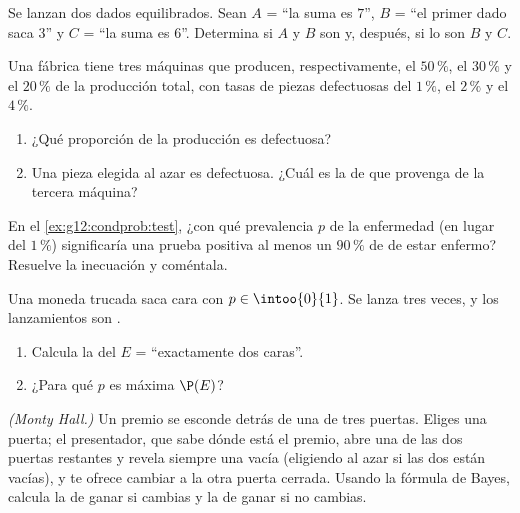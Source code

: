 \begin{exercise}[$\star$]\label{exo:g12:condprob:3}
Se lanzan dos dados equilibrados. Sean $A$ = ``la suma es $7$'', $B$ = ``el
primer dado saca $3$'' y $C$ = ``la suma es $6$''. Determina si $A$ y $B$
son  y, después, si lo son $B$ y $C$.
\end{exercise}

\begin{exercise}[$\star\star$]\label{exo:g12:condprob:4}
Una fábrica tiene tres máquinas que producen, respectivamente, el
$50\,\%$, el $30\,\%$ y el $20\,\%$ de la producción total, con tasas de
piezas defectuosas del $1\,\%$, el $2\,\%$ y el $4\,\%$.
\begin{enumerate}
  \item ¿Qué proporción de la producción es defectuosa?
  \item Una pieza elegida al azar es defectuosa. ¿Cuál es la 
        de que provenga de la tercera máquina?
\end{enumerate}
\end{exercise}

\begin{exercise}[$\star\star$]\label{exo:g12:condprob:5}
En el \cref{ex:g12:condprob:test}, ¿con qué prevalencia $p$ de la
enfermedad (en lugar del $1\,\%$) significaría una prueba positiva al menos
un $90\,\%$ de  de estar enfermo? Resuelve la inecuación y
coméntala.
\end{exercise}

\begin{exercise}[$\star\star$]\label{exo:g12:condprob:6}
Una moneda trucada saca cara con  $p \in \intoo{0}{1}$. Se
lanza tres veces, y los lanzamientos son .
\begin{enumerate}
  \item Calcula la  del  $E$ = ``exactamente dos caras''.
  \item ¿Para qué $p$ es máxima $\P(E)$?
\end{enumerate}
\end{exercise}

\begin{exercise}[$\star\star\star$]\label{exo:g12:condprob:7}
\emph{(Monty Hall.)} Un premio se esconde detrás de una de tres puertas.
Eliges una puerta; el presentador, que sabe dónde está el premio, abre una
de las dos puertas restantes y revela siempre una vacía (eligiendo al azar
si las dos están vacías), y te ofrece cambiar a la otra puerta cerrada.
Usando la fórmula de Bayes, calcula la  de ganar si cambias y
la  de ganar si no cambias.
\end{exercise}

